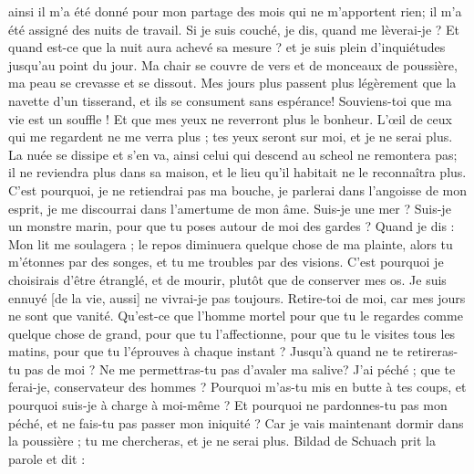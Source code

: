 \begin{multicols}{2}
ainsi il m'a été donné pour mon partage des mois qui ne m'apportent rien; il m'a été assigné des nuits de travail.
Si je suis couché, je dis, quand me lèverai-je ? Et quand est-ce que la nuit aura achevé sa mesure ? et je suis plein d'inquiétudes jusqu'au point du jour.
Ma chair se couvre de vers et de monceaux de poussière, ma peau se crevasse et se dissout.
Mes jours plus passent plus légèrement que la navette d'un tisserand, et ils se consument sans espérance!
Souviens-toi que ma vie est un souffle ! Et que mes yeux ne reverront plus le bonheur.
L'œil de ceux qui me regardent ne me verra plus ; tes yeux seront sur moi, et je ne serai plus.
La nuée se dissipe et s'en va, ainsi celui qui descend au scheol ne remontera pas;
il ne reviendra plus dans sa maison, et le lieu qu'il habitait ne le reconnaîtra plus.
C'est pourquoi, je ne retiendrai pas ma bouche, je parlerai dans l'angoisse de mon esprit, je me discourrai dans l'amertume de mon âme.
Suis-je une mer ? Suis-je un monstre marin, pour que tu poses autour de moi des gardes ?
Quand je dis : Mon lit me soulagera ; le repos diminuera quelque chose de ma plainte,
alors tu m'étonnes par des songes, et tu me troubles par des visions.
C'est pourquoi je choisirais d'être étranglé, et de mourir, plutôt que de conserver mes os.
Je suis ennuyé [de la vie, aussi] ne vivrai-je pas toujours. Retire-toi de moi, car mes jours ne sont que vanité.
Qu'est-ce que l'homme mortel pour que tu le regardes comme quelque chose de grand, pour que tu l'affectionne,
pour que tu le visites tous les matins, pour que tu l'éprouves à chaque instant ?
Jusqu'à quand ne te retireras-tu pas de moi ? Ne me permettras-tu pas d'avaler ma salive?
J'ai péché ; que te ferai-je, conservateur des hommes ?  Pourquoi m'as-tu mis en butte à tes coups, et pourquoi suis-je à charge à moi-même ?
Et pourquoi ne pardonnes-tu pas mon péché, et ne fais-tu pas passer mon iniquité ? Car je vais maintenant dormir dans la poussière ; tu me chercheras, et je ne serai plus.
\VerseOne{}Bildad de Schuach prit la parole et dit :

\end{multicols}
